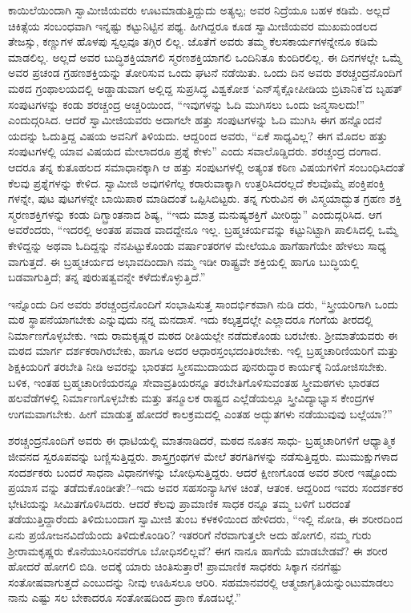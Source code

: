 ಕಾಯಿಲೆಯಿಂದಾಗಿ ಸ್ವಾಮೀಜಿಯವರು ಊಟಮಾಡುತ್ತಿದ್ದುದು ಅತ್ಯಲ್ಪ; ಅವರ ನಿದ್ರೆಯೂ ಬಹಳ ಕಡಿಮೆ. ಅಲ್ಲದೆ ಚಿಕಿತ್ಸೆಯ ಸಂಬಂಧವಾಗಿ ಇನ್ನಷ್ಟು ಕಟ್ಟುನಿಟ್ಟಿನ ಪಥ್ಯ. ಹೀಗಿದ್ದರೂ ಕೂಡ ಸ್ವಾಮೀಜಿಯವರ ಮುಖಮಂಡಲದ ತೇಜಸ್ಸು, ಕಣ್ಣುಗಳ ಹೊಳಪು ಸ್ವಲ್ಪವೂ ತಗ್ಗಿರ ಲಿಲ್ಲ. ಜೊತೆಗೆ ಅವರು ತಮ್ಮ ಕೆಲಸಕಾರ್ಯಗಳನ್ನೇನೂ ಕಡಿಮೆ ಮಾಡಲಿಲ್ಲ. ಅಲ್ಲದೆ ಅವರ ಬುದ್ಧಿಶಕ್ತಿಯಾಗಲಿ ಸ್ಮರಣಶಕ್ತಿಯಾಗಲಿ ಒಂದಿನಿತೂ ಕುಂದಿರಲಿಲ್ಲ. ಈ ದಿನಗಳಲ್ಲೇ ಒಮ್ಮೆ ಅವರ ಪ್ರಚಂಡ ಗ್ರಹಣಶಕ್ತಿಯನ್ನು ತೋರಿಸುವ ಒಂದು ಘಟನೆ ನಡೆಯಿತು. ಒಂದು ದಿನ ಅವರು ಶರಚ್ಚಂದ್ರನೊಂದಿಗೆ ಮಠದ ಗ್ರಂಥಾಲಯದಲ್ಲಿ ಅಡ್ಡಾಡುವಾಗ ಅಲ್ಲಿದ್ದ ಸುಪ್ರಸಿದ್ಧ ವಿಶ್ವಕೋಶ ‘ಎನ್​ಸೈಕ್ಲೋಪೀಡಿಯ ಬ್ರಿಟಾನಿಕ’ದ ಬೃಹತ್ ಸಂಪುಟಗಳನ್ನು ಕಂಡು ಶರಚ್ಚಂದ್ರ ಅಚ್ಚರಿಯಿಂದ, “ಇವುಗಳನ್ನು ಓದಿ ಮುಗಿಸಲು ಒಂದು ಜನ್ಮಸಾಲದು!” ಎಂದುದ್ಗರಿಸಿದ. ಆದರೆ ಸ್ವಾಮೀಜಿಯವರು ಅದಾಗಲೇ ಹತ್ತು ಸಂಪುಟಗಳನ್ನು ಓದಿ ಮುಗಿಸಿ ಈಗ ಹನ್ನೊಂದನೆ ಯದನ್ನು ಓದುತ್ತಿದ್ದ ವಿಷಯ ಅವನಿಗೆ ತಿಳಿಯದು. ಆದ್ದರಿಂದ ಅವರು, “ಏಕೆ ಸಾಧ್ಯವಿಲ್ಲ? ಈಗ ಮೊದಲ ಹತ್ತು ಸಂಪುಟಗಳಲ್ಲಿ ಯಾವ ವಿಷಯದ ಮೇಲಾದರೂ ಪ್ರಶ್ನೆ ಕೇಳು” ಎಂದು ಸವಾಲೊಡ್ಡಿದರು. ಶರಚ್ಚಂದ್ರ ದಂಗಾದ. ಆದರೂ ತನ್ನ ಕುತೂಹಲದ ಸಮಾಧಾನಕ್ಕಾಗಿ ಆ ಹತ್ತು ಸಂಪುಟಗಳಲ್ಲಿ ಅತ್ಯಂತ ಕಠಿಣ ವಿಷಯಗಳಿಗೆ ಸಂಬಂಧಿಸಿದಂತೆ ಕೆಲವು ಪ್ರಶ್ನೆಗಳನ್ನು ಕೇಳಿದ. ಸ್ವಾಮೀಜಿ ಅವುಗಳಿಗೆಲ್ಲ ಕರಾರುವಾಕ್ಕಾಗಿ ಉತ್ತರಿಸಿದರಲ್ಲದೆ ಕೆಲವೊಮ್ಮೆ ಪಂಕ್ತಿಪಂಕ್ತಿ ಗಳನ್ನೇ, ಪುಟ ಪುಟಗಳನ್ನೇ ಬಾಯಿಪಾಠ ಮಾಡಿದಂತೆ ಒಪ್ಪಿಸಿಬಿಟ್ಟರು. ತನ್ನ ಗುರುವಿನ ಈ ವಿಸ್ಮಯಾದ್ಭುತ ಗ್ರಹಣ ಶಕ್ತಿ ಸ್ಮರಣಶಕ್ತಿಗಳನ್ನು ಕಂಡು ದಿಗ್ಬ್ರಾಂತನಾದ ಶಿಷ್ಯ, “ಇದು ಮಾತ್ರ ಮನುಷ್ಯಶಕ್ತಿಗೆ ಮೀರಿದ್ದು” ಎಂದುದ್ಗರಿಸಿದ. ಆಗ ಅವರೆಂದರು, “ಇದರಲ್ಲಿ ಅಂತಹ ಪವಾಡ ವಾದದ್ದೇನೂ ಇಲ್ಲ. ಬ್ರಹ್ಮಚರ್ಯವನ್ನು ಕಟ್ಟುನಿಟ್ಟಾಗಿ ಪಾಲಿಸಿದಲ್ಲಿ ಒಮ್ಮೆ ಕೇಳಿದ್ದನ್ನು ಅಥವಾ ಓದಿದ್ದನ್ನು ನೆನಪಿಟ್ಟುಕೊಂಡು ವರ್ಷಾಂತರಗಳ ಮೇಲೆಯೂ ಹಾಗೆಹಾಗೆಯೇ ಹೇಳಲು ಸಾಧ್ಯ ವಾಗುತ್ತದೆ. ಈ ಬ್ರಹ್ಮಚರ್ಯದ ಅಭಾವದಿಂದಾಗಿ ನಮ್ಮ ಇಡೀ ರಾಷ್ಟ್ರವೇ ಶಕ್ತಿಯಲ್ಲಿ ಹಾಗೂ ಬುದ್ಧಿಯಲ್ಲಿ ಬಡವಾಗುತ್ತಿದೆ; ತನ್ನ ಪುರುಷತ್ವವನ್ನೇ ಕಳೆದುಕೊಳ್ಳುತ್ತಿದೆ.”

ಇನ್ನೊಂದು ದಿನ ಅವರು ಶರಚ್ಚಂದ್ರನೊಂದಿಗೆ ಸಂಭಾಷಿಸುತ್ತ ಸಾಂದರ್ಭಿಕವಾಗಿ ನುಡಿ ದರು, “ಸ್ತ್ರೀಯರಿಗಾಗಿ ಒಂದು ಮಠ ಸ್ಥಾಪನೆಯಾಗಬೇಕು ಎನ್ನುವುದು ನನ್ನ ಮನದಾಸೆ. ಇದು ಕಲ್ಕತ್ತದಲ್ಲೇ ಎಲ್ಲಾದರೂ ಗಂಗೆಯ ತೀರದಲ್ಲಿ ನಿರ್ಮಾಣಗೊಳ್ಳಬೇಕು. ಇದು ರಾಮಕೃಷ್ಣರ ಮಠದ ರೀತಿಯಲ್ಲೇ ನಡೆದುಕೊಂಡು ಬರಬೇಕು. ಶ್ರೀಮಾತೆಯವರು ಈ ಮಠದ ಮಾರ್ಗ ದರ್ಶಕರಾಗಿರಬೇಕು, ಹಾಗೂ ಅದರ ಆಧಾರಸ್ತಂಭದಂತಿರಬೇಕು. ಇಲ್ಲಿ ಬ್ರಹ್ಮಚಾರಿಣಿಯರಿಗೆ ಮತ್ತು ಶಿಕ್ಷಕಿಯರಿಗೆ ತರಬೇತಿ ನೀಡಿ ಅವರನ್ನು ಭಾರತದ ಸ್ತ್ರೀಸಮುದಾಯದ ಪುನರುದ್ಧಾರ ಕಾರ್ಯಕ್ಕೆ ನಿಯೋಜಿಸಬೇಕು. ಬಳಿಕ, ಇಂತಹ ಬ್ರಹ್ಮಚಾರಿಣಿಯರನ್ನೂ ಸೇವಾವ್ರತಿಯರನ್ನೂ ತರಬೇತಿಗೊಳಿಸುವಂತಹ ಸ್ತ್ರೀಮಠಗಳು ಭಾರತದ ಹಲವೆಡೆಗಳಲ್ಲಿ ನಿರ್ಮಾಣಗೊಳ್ಳಬೇಕು ಮತ್ತು ತನ್ಮೂಲಕ ರಾಷ್ಟ್ರದ ಎಲ್ಲೆಡೆಯಲ್ಲೂ ಸ್ತ್ರೀವಿದ್ಯಾಭ್ಯಾಸ ಕೇಂದ್ರಗಳ ಉಗಮವಾಗಬೇಕು. ಹೀಗೆ ಮಾಡುತ್ತ ಹೋದರೆ ಕಾಲಕ್ರಮದಲ್ಲಿ ಎಂತಹ ಅದ್ಭುತಗಳು ನಡೆಯುವುವು ಬಲ್ಲೆಯಾ?”

ಶರಚ್ಚಂದ್ರನೊಂದಿಗೆ ಅವರು ಈ ಧಾಟಿಯಲ್ಲಿ ಮಾತನಾಡಿದರೆ, ಮಠದ ನೂತನ ಸಾಧು- ಬ್ರಹ್ಮಚಾರಿಗಳಿಗೆ ಆಧ್ಯಾತ್ಮಿಕ ಜೀವನದ ಸ್ವರೂಪವನ್ನು ಬಣ್ಣಿಸುತ್ತಿದ್ದರು. ಶಾಸ್ತ್ರಗ್ರಂಥಗಳ ಮೇಲೆ ತರಗತಿಗಳನ್ನು ನಡೆಸುತ್ತಿದ್ದರು. ಮುಮುಕ್ಷುಗಳಾದ ಸಂದರ್ಶಕರು ಬಂದರೆ ಸಾಧನಾ ವಿಧಾನಗಳನ್ನು ಬೋಧಿಸುತ್ತಿದ್ದರು. ಆದರೆ ಕ್ಷೀಣಗೊಂಡ ಅವರ ಶರೀರ ಇಷ್ಟೊಂದು ಪ್ರಯಾಸ ವನ್ನು ತಡೆದುಕೊಂಡೀತೇ?–ಇದು ಅವರ ಸಹಸಂನ್ಯಾಸಿಗಳ ಚಿಂತೆ, ಆತಂಕ. ಆದ್ದರಿಂದ ಇವರು ಸಂದರ್ಶಕರ ಭೇಟಿಯನ್ನು ಸೀಮಿತಗೊಳಿಸಿದರು. ಆದರೆ ಕೆಲವು ಪ್ರಾಮಾಣಿಕ ಸಾಧಕ ರನ್ನೂ ತಮ್ಮ ಬಳಿಗೆ ಬರದಂತೆ ತಡೆಯುತ್ತಿದ್ದಾರೆಂದು ತಿಳಿದುಬಂದಾಗ ಸ್ವಾಮೀಜಿ ತುಂಬ ಕಳಕಳಿಯಿಂದ ಹೇಳಿದರು, “ಇಲ್ಲಿ ನೋಡಿ, ಈ ಶರೀರದಿಂದ ಏನು ಪ್ರಯೋಜನವಿದೆಯೆಂದು ತಿಳಿದುಕೊಂಡಿರಿ? ಇತರರಿಗೆ ನೆರವಾಗುತ್ತಲೇ ಅದು ಹೋಗಲಿ, ನಮ್ಮ ಗುರು ಶ್ರೀರಾಮಕೃಷ್ಣರು ಕೊನೆಯುಸಿರಿನವರೆಗೂ ಬೋಧಿಸಲಿಲ್ಲವೆ? ಈಗ ನಾನೂ ಹಾಗೆಯೆ ಮಾಡಬೇಡವೆ? ಈ ಶರೀರ ಹೋದರೆ ಹೋಗಲಿ ಬಿಡಿ. ಅದಕ್ಕೆ ಯಾರು ಚಿಂತಿಸುತ್ತಾರೆ! ಪ್ರಾಮಾಣಿಕ ಸಾಧಕರು ಸಿಕ್ಕಾಗ ನನಗೆಷ್ಟು ಸಂತೋಷವಾಗುತ್ತದೆ ಎಂಬುದನ್ನು ನೀವು ಊಹಿಸಲೂ ಆರಿರಿ. ಸಹಮಾನವರಲ್ಲಿ ಆತ್ಮಜಾಗೃತಿಯನ್ನುಂಟುಮಾಡಲು ನಾನು ಎಷ್ಟು ಸಲ ಬೇಕಾದರೂ ಸಂತೋಷದಿಂದ ಪ್ರಾಣ ಕೊಡಬಲ್ಲೆ.”

